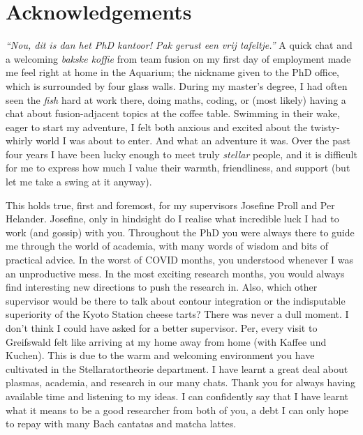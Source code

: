 \chapter*{Acknowledgements}
\begin{CJK}{UTF8}{min}
{\it``Nou, dit is dan het PhD kantoor! Pak gerust een vrij tafeltje.''} A quick chat and a welcoming {\it bakske koffie} from team fusion on my first day of employment made me feel right at home in the Aquarium; the nickname given to the PhD office, which is surrounded by four glass walls. During my master's degree, I had often seen the {\it fish} hard at work there, doing maths, coding, or (most likely) having a chat about fusion-adjacent topics at the coffee table. Swimming in their wake, eager to start my adventure, I felt both anxious and excited about the twisty-whirly world I was about to enter. And what an adventure it was. Over the past four years I have been lucky enough to meet truly {\it stellar} people, and it is difficult for me to express how much I value their warmth, friendliness, and support (but let me take a swing at it anyway). \par 

This holds true, first and foremost, for my supervisors Josefine Proll and Per Helander. Josefine, only in hindsight do I realise what incredible luck I had to work (and gossip) with you. Throughout the PhD you were always there to guide me through the world of academia, with many words of wisdom and bits of practical advice. In the worst of COVID months, you understood whenever I was an unproductive mess. In the most exciting research months, you would always find interesting new directions to push the research in. Also, which other supervisor would be there to talk about contour integration or the indisputable superiority of the Kyoto Station cheese tarts? There was never a dull moment. I don't think I could have asked for a better supervisor. Per, every visit to Greifswald felt like arriving at my home away from home (with Kaffee und Kuchen). This is due to the warm and welcoming environment you have cultivated in the Stellaratortheorie department. I have learnt a great deal about plasmas, academia, and research in our many chats. Thank you for always having available time and listening to my ideas. I can confidently say that I have learnt what it means to be a good researcher from both of you, a debt I can only hope to repay with many Bach cantatas and matcha lattes. \par 


\end{CJK}
